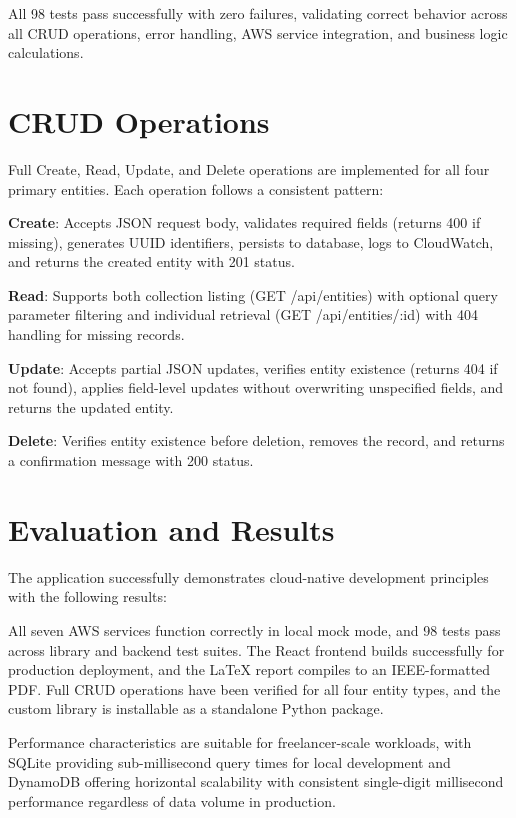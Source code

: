 \documentclass[conference]{IEEEtran}
\begin{document}
All 98 tests pass successfully with zero failures, validating correct behavior across all CRUD operations, error handling, AWS service integration, and business logic calculations.

\section{CRUD Operations}

Full Create, Read, Update, and Delete operations are implemented for all four primary entities. Each operation follows a consistent pattern:

\textbf{Create}: Accepts JSON request body, validates required fields (returns 400 if missing), generates UUID identifiers, persists to database, logs to CloudWatch, and returns the created entity with 201 status.

\textbf{Read}: Supports both collection listing (GET /api/entities) with optional query parameter filtering and individual retrieval (GET /api/entities/:id) with 404 handling for missing records.

\textbf{Update}: Accepts partial JSON updates, verifies entity existence (returns 404 if not found), applies field-level updates without overwriting unspecified fields, and returns the updated entity.

\textbf{Delete}: Verifies entity existence before deletion, removes the record, and returns a confirmation message with 200 status.

\section{Evaluation and Results}

The application successfully demonstrates cloud-native development principles with the following results:

All seven AWS services function correctly in local mock mode, and 98 tests pass across library and backend test suites. The React frontend builds successfully for production deployment, and the LaTeX report compiles to an IEEE-formatted PDF. Full CRUD operations have been verified for all four entity types, and the custom library is installable as a standalone Python package.

Performance characteristics are suitable for freelancer-scale workloads, with SQLite providing sub-millisecond query times for local development and DynamoDB offering horizontal scalability with consistent single-digit millisecond performance regardless of data volume in production.
\end{document}
